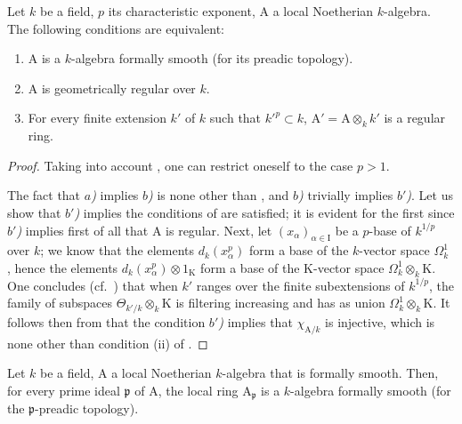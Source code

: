 \begin{theorem}[22.5.8]
\label{0.22.5.8}
Let $k$ be a field, $p$ its characteristic exponent, $\mathrm{A}$ a local Noetherian $k$-algebra.
The following conditions are equivalent:
\begin{enumerate}
  \item[\textup{a)}] $\mathrm{A}$ is a $k$-algebra formally smooth (for its preadic topology).
  \item[\textup{b)}] $\mathrm{A}$ is geometrically regular over $k$.
  \item[\textup{b')}] For every finite extension $k'$ of $k$ such that $k'^p\subset k$, $\mathrm{A}'=\mathrm{A}\otimes_kk'$ is a regular ring.
\end{enumerate}
\end{theorem}

\begin{proof}
Taking into account , one can restrict oneself to the case $p>1$.

The fact that \emph{$a$)} implies \emph{$b$)} is none other than , and \emph{$b$)} trivially implies \emph{$b'$)}.
Let us show that \emph{$b'$)} implies the conditions of  are satisfied; it is evident for the first  since \emph{$b'$)} implies first of all that $\mathrm{A}$ is regular.
Next, let $(x_\alpha)_{\alpha\in\mathrm{I}}$ be a $p$-base of $k^{1/p}$ over $k$; we know that the elements $d_k(x_\alpha^p)$ form a base of the $k$-vector space $\Omega^1_k$ , hence the elements $d_k(x_\alpha^p)\otimes 1_\mathrm{K}$ form a base of the $\mathrm{K}$-vector space $\Omega^1_k\otimes_k\mathrm{K}$.
One concludes (cf.~) that when $k'$ ranges over the finite subextensions of $k^{1/p}$, the family of subspaces $\Theta_{k'/k}\otimes_k\mathrm{K}$ is filtering increasing and has as union $\Omega^1_k\otimes_k\mathrm{K}$.
It follows then from  that the condition \emph{$b'$)} implies that $\chi_{\mathrm{A}/k}$ is injective, which is none other than condition (ii) of .
\end{proof}

\begin{corollary}[22.5.9]
\label{0.22.5.9}
Let $k$ be a field, $\mathrm{A}$ a local Noetherian $k$-algebra that is formally smooth.
Then, for every prime ideal $\mathfrak{p}$ of $\mathrm{A}$, the local ring $\mathrm{A}_\mathfrak{p}$ is a $k$-algebra formally smooth (for the $\mathfrak{p}$-preadic topology).
\end{corollary}

